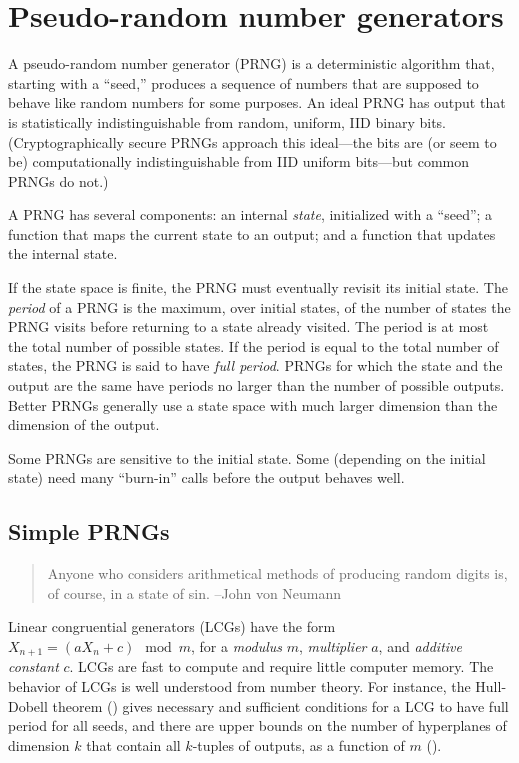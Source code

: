 \documentclass[graybox]{svmult}
\begin{document}
\section{Pseudo-random number generators}
\label{sec:prngs}

A pseudo-random number generator (PRNG) is a deterministic algorithm that, starting with
a ``seed,'' produces a sequence of numbers that are supposed to behave like random numbers
for some purposes.
An ideal PRNG has output that is statistically indistinguishable from random, uniform, IID 
binary bits. 
(Cryptographically secure PRNGs approach this ideal---the bits are (or seem to be) computationally indistinguishable from IID uniform bits---but common PRNGs do not.)

A PRNG has several components:
an internal \emph{state}, initialized with a ``seed'';
a function that maps the current state to an output;
and a function that updates the internal state.

If the state space is finite, the PRNG must eventually revisit its initial state.
The \emph{period} of a PRNG is the maximum, over initial states, of the number of states 
the PRNG visits before returning to a state already visited.
The period is at most the total number of possible states.
If the period is equal to the total number of states, the PRNG is said to have \emph{full period}.
PRNGs for which the state and the output are the same have periods no larger than the number of possible outputs.
Better PRNGs generally use a state space with much larger dimension than the dimension of the output.

Some PRNGs are sensitive to the initial state.
Some (depending on the initial state) need many ``burn-in'' calls before the output 
behaves well.

\subsection{Simple PRNGs}

\begin{quotation}
Anyone who considers arithmetical methods of producing random digits is, of course, in a state of sin.  --John von Neumann
\end{quotation}


Linear congruential generators (LCGs) have the form $X_{n+1} = (a X_n + c) \mod m$, for a 
\emph{modulus} $m$, 
\emph{multiplier} $a$, and \emph{additive constant} $c$.
LCGs are fast to compute and require little computer memory.
The behavior of LCGs is well understood from number theory.
For instance, the Hull-Dobell theorem (\cite{hullDobell62})
gives necessary and sufficient conditions for a LCG to have full period for all seeds,
and there are upper bounds on the number of hyperplanes of dimension $k$
that contain all $k$-tuples of outputs, as a function of $m$ (\cite{marsaglia_random_1968}).
\end{document}
